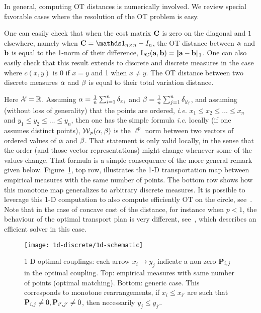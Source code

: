 In general, computing OT distances is numerically involved. We review special favorable cases where the resolution of the OT problem is easy.

\begin{rem}\label{rem-binary}
One can easily check that when the cost matrix $\C$ is zero on the diagonal and $1$ elsewhere, namely when $\C=\ones_{n\times n}-I_n$, the OT distance between $\a$ and $\b$ is equal to the 1-norm of their difference, $\MKD_\C(\a,\b)=\norm{\a-\b}_1$.
%
One can also easily check that this result extends to discrete and discrete measures in the case where $c(x,y)$ is $0$ if $x=y$ and 1 when $x\ne y$. The OT distance between two discrete measures $\al$ and $\be$ is equal to their total variation distance.
\end{rem}


\begin{rem}
Here $\X=\RR$. Assuming $\al = \frac{1}{n}\sum_{i=1}^n \de_{x_i}$ and $\be = \frac{1}{n}\sum_{j=1}^n \de_{y_j}$, and assuming (without loss of generality) that the points are ordered, \emph{i.e.} $x_1 \leq x_2 \leq \ldots \leq x_n$ and $y_1 \leq y_2 \leq \ldots \leq y_n$, then one has the simple formula
\emph{i.e.} locally (if one assumes distinct points), $\Wass_p(\al,\be)$ is the $\ell^p$ norm between two vectors of ordered values of $\al$ and $\be$. That statement is only valid locally, in the sense that the order (and those vector representations) might change whenever some of the values change. That formula is a simple consequence of the more general remark given below. 
%
Figure~\ref{fig-1d-discrete}, top row, illustrates the 1-D transportation map between empirical measures with the same number of points. 
 The bottom row shows how this monotone map generalizes to arbitrary discrete measures. 
%
It is possible to leverage this 1-D computation to also compute efficiently OT on the circle, see~\cite{delon-circle}.  
%
Note that in the case of concave cost of the distance, for instance when $p<1$, the behaviour of the optimal transport plan is very different, see~\cite{delon-concave}, which describes an efficient solver in this case.
\end{rem}


\begin{figure}
\centering
\texttt{[image: 1d-discrete/1d-schematic]}
\caption{\label{fig-1d-discrete}
1-D optimal couplings: each arrow $x_i \rightarrow y_j$ indicate a non-zero $\P_{i,j}$ in the optimal coupling.
% 
Top: empirical measures with same number of points (optimal matching).
Bottom: generic case. 
%
This corresponds to monotone rearrangements, if $x_i \leq x_{i'}$ are such that $\P_{i,j} \neq 0, \P_{i',j'} \neq 0$, then necessarily $y_j \leq y_{j'}$.
}
\end{figure}


